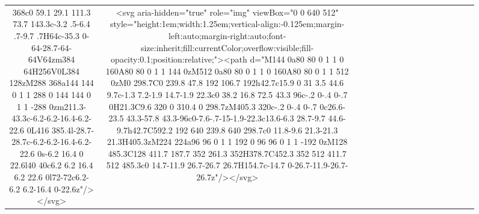 \documentclass[
]{article}
\begin{document}
\begin{figure*}
\begin{longtable*}{cclllccccccccccl}
368c0 59.1 29.1 111.3 73.7 143.3c-3.2 .5-6.4 .7-9.7 .7H64c-35.3 0-64-28.7-64-64V64zm384 64H256V0L384 128zM288 368a144 144 0 1 1 288 0 144 144 0 1 1 -288 0zm211.3-43.3c-6.2-6.2-16.4-6.2-22.6 0L416 385.4l-28.7-28.7c-6.2-6.2-16.4-6.2-22.6 0s-6.2 16.4 0 22.6l40 40c6.2 6.2 16.4 6.2 22.6 0l72-72c6.2-6.2 6.2-16.4 0-22.6z"/></svg> & <svg aria-hidden="true" role="img" viewBox="0 0 640 512" style="height:1em;width:1.25em;vertical-align:-0.125em;margin-left:auto;margin-right:auto;font-size:inherit;fill:currentColor;overflow:visible;fill-opacity:0.1;position:relative;"><path d="M144 0a80 80 0 1 1 0 160A80 80 0 1 1 144 0zM512 0a80 80 0 1 1 0 160A80 80 0 1 1 512 0zM0 298.7C0 239.8 47.8 192 106.7 192h42.7c15.9 0 31 3.5 44.6 9.7c-1.3 7.2-1.9 14.7-1.9 22.3c0 38.2 16.8 72.5 43.3 96c-.2 0-.4 0-.7 0H21.3C9.6 320 0 310.4 0 298.7zM405.3 320c-.2 0-.4 0-.7 0c26.6-23.5 43.3-57.8 43.3-96c0-7.6-.7-15-1.9-22.3c13.6-6.3 28.7-9.7 44.6-9.7h42.7C592.2 192 640 239.8 640 298.7c0 11.8-9.6 21.3-21.3 21.3H405.3zM224 224a96 96 0 1 1 192 0 96 96 0 1 1 -192 0zM128 485.3C128 411.7 187.7 352 261.3 352H378.7C452.3 352 512 411.7 512 485.3c0 14.7-11.9 26.7-26.7 26.7H154.7c-14.7 0-26.7-11.9-26.7-26.7z"/></svg> &  \\ 

\end{longtable*}
\end{figure*}
\end{document}
